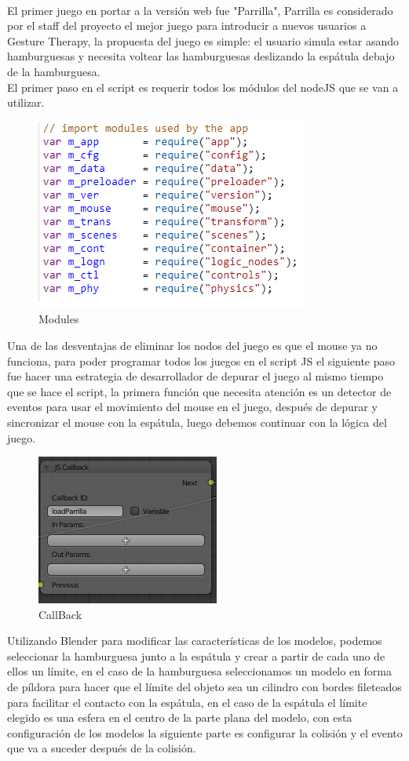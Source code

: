 \documentclass{article}
\begin{document}
\\
El primer juego en portar a la versión web fue "Parrilla", Parrilla es considerado por el staff del proyecto el mejor juego para introducir a nuevos usuarios a Gesture Therapy, la propuesta del juego es simple: el usuario simula estar asando hamburguesas y necesita voltear las hamburguesas deslizando la espátula debajo de la hamburguesa.
\\
El primer paso en el script es requerir todos los módulos del nodeJS que se van a utilizar.
\\
\begin{figure}[h]
    \centering
    \includegraphics[scale=1]{modules.png}
    \caption{Modules}
    \label{Modules}
\end{figure}
Una de las desventajas de eliminar los nodos del juego es que el mouse ya no funciona, para poder programar todos los juegos en el script JS el siguiente paso fue hacer una estrategia de desarrollador de depurar el juego al mismo tiempo que se hace el script, la primera función que necesita atención es un detector de eventos para usar el movimiento del mouse en el juego, después de depurar y sincronizar el mouse con la espátula, luego debemos continuar con la lógica del juego.
\\
\begin{figure}[h]
    \centering
    \includegraphics[scale=1.5]{parrilla_callback.PNG}
    \caption{CallBack}
    \label{CallBackParrilla}
\end{figure}
Utilizando Blender para modificar las características de los modelos, podemos seleccionar la hamburguesa junto a la espátula y crear a partir de cada uno de ellos un límite, en el caso de la hamburguesa seleccionamos un modelo en forma de  píldora para hacer que el límite del objeto sea un cilindro con bordes fileteados para facilitar el contacto con la espátula, en el caso de la espátula el límite elegido es una esfera en el centro de la parte plana del modelo, con esta configuración de los modelos la siguiente parte es configurar la colisión y el evento que va a suceder después de la colisión. \\
\end{document}
